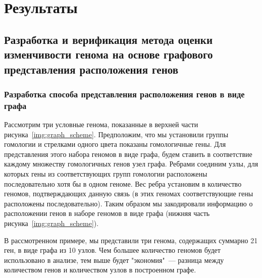 \chapter{Результаты}
\section{Разработка и верификация метода оценки изменчивости генома на основе графового представления расположения генов} \label{chaptComplex1}

\subsection{Разработка способа представления расположения генов в виде графа}
Рассмотрим три условные генома, показанные в верхней части рисунка~\ref{img:graph_scheme}. Предположим, что мы установили группы гомологии и стрелками одного цвета показаны гомологичные гены. Для представления этого набора геномов в виде графа, будем ставить в соответствие каждому множеству гомологичных генов узел графа. Ребрами соединим узлы, для которых гены из соответствующих групп гомологии расположены последовательно хотя бы в одном геноме. Вес ребра установим в количество геномов, подтверждающих данную связь (в этих геномах соответствующие гены расположены последовательно). Таким образом мы закодировали информацию о расположении генов в наборе геномов в виде графа (нижняя часть рисунка~\ref{img:graph_scheme}). 

В рассмотренном примере, мы представили  три генома, содержащих суммарно 21 ген, в виде графа из 10 узлов. Чем большее количество геномов будет использовано в анализе, тем выше будет "экономия"\ --- разница между количеством генов и количеством узлов в построенном графе.

